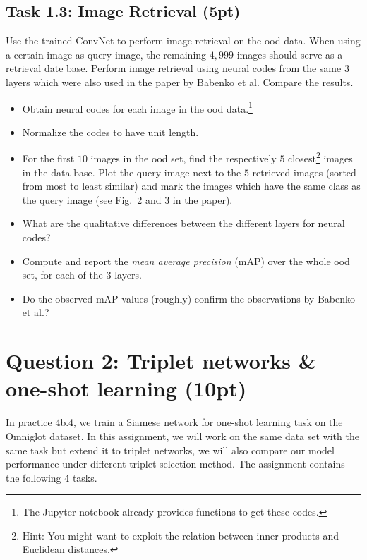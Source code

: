 \documentclass[a4paper,twoside,10pt]{article}
\begin{document}
	\subsection*{Task 1.3: Image Retrieval (5pt)}   
	Use the trained ConvNet to perform image retrieval on the ood data.
	When using a certain image as query image, the remaining $4,999$ images should serve as a retrieval date base.
	Perform image retrieval using neural codes from the same $3$ layers which were also used in the paper by Babenko et al.
	Compare the results.
	\begin{itemize}
		\item Obtain neural codes for each image in the ood data.\footnote{The Jupyter notebook already provides functions to get these codes.}
		\item Normalize the codes to have unit length.
		\item For the first $10$ images in the ood set, find the respectively $5$ closest\footnote{Hint: You might want to exploit the relation between inner products and Euclidean distances.} images in the data base. 
		Plot the query image next to the $5$ retrieved images (sorted from most to least similar) and mark the images which have the same class as the query image (see Fig.~2 and 3 in the paper).
		\item What are the qualitative differences between the different layers for neural codes?
		\item Compute and report the \emph{mean average precision} (mAP) over the whole ood set, for each of the $3$ layers. 
		\item Do the observed mAP values (roughly) confirm the observations by Babenko et al.?
	\end{itemize}
	
	
	
	
	\vspace{\baselineskip}
	
	
	
	
	\section*{Question 2: Triplet networks \& one-shot learning (10pt)}
	In practice 4b.4, we train a Siamese network for one-shot learning task on the Omniglot dataset.  In this assignment, we will work on the same data set with the same task but extend it to triplet networks, we will also compare our model performance under different triplet selection method. The assignment contains the following 4 tasks.
	
\end{document}
